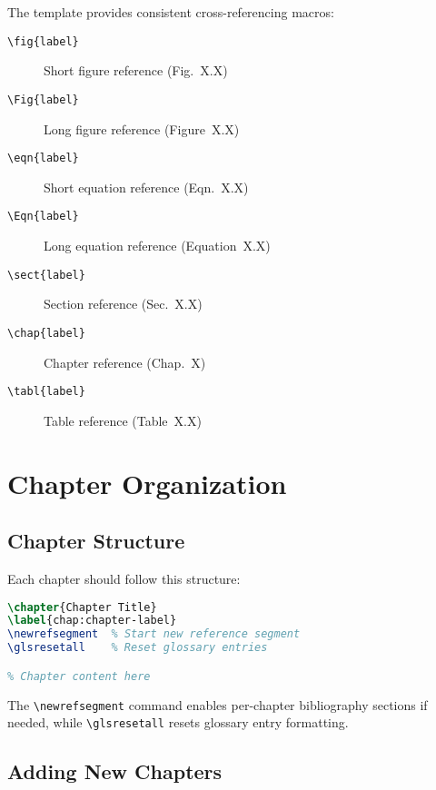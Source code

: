 The template provides consistent cross-referencing macros:

\begin{description}
    \item[\texttt{\textbackslash fig\{label\}}] Short figure reference (Fig.~X.X)
    \item[\texttt{\textbackslash Fig\{label\}}] Long figure reference (Figure~X.X)
    \item[\texttt{\textbackslash eqn\{label\}}] Short equation reference (Eqn.~X.X)
    \item[\texttt{\textbackslash Eqn\{label\}}] Long equation reference (Equation~X.X)
    \item[\texttt{\textbackslash sect\{label\}}] Section reference (Sec.~X.X)
    \item[\texttt{\textbackslash chap\{label\}}] Chapter reference (Chap.~X)
    \item[\texttt{\textbackslash tabl\{label\}}] Table reference (Table~X.X)
\end{description}

\section{Chapter Organization}
\label{sect:chapter-organization}

\subsection{Chapter Structure}
\label{sect:chapter-structure}

Each chapter should follow this structure:

\begin{lstlisting}[language=TeX,caption={Standard chapter template}]
\chapter{Chapter Title}
\label{chap:chapter-label}
\newrefsegment  % Start new reference segment
\glsresetall    % Reset glossary entries

% Chapter content here
\end{lstlisting}

The \texttt{\textbackslash newrefsegment} command enables per-chapter bibliography sections if needed, while \texttt{\textbackslash glsresetall} resets glossary entry formatting.

\subsection{Adding New Chapters}
\label{sect:adding-chapters}

